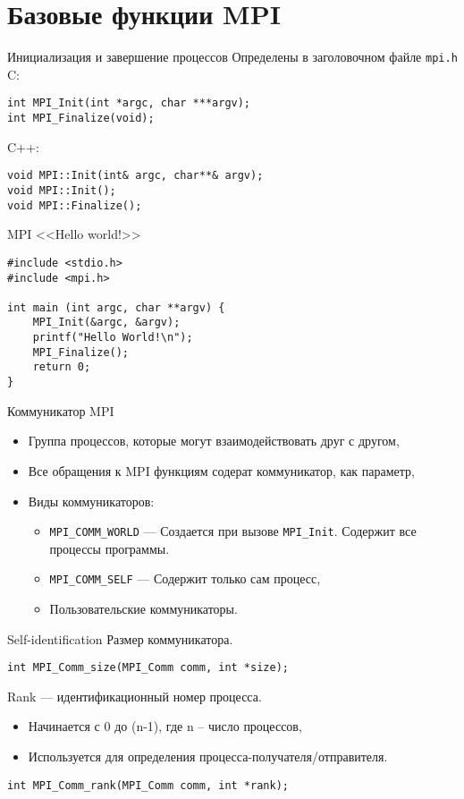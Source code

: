 \section{Базовые функции MPI}

\begin{frame}[fragile]{Инициализация и завершение процессов}
Определены в заголовочном файле \texttt{mpi.h}
\vfill
C:
\begin{lstlisting}
int MPI_Init(int *argc, char ***argv);
int MPI_Finalize(void);
\end{lstlisting}
\vfill
C++:
\begin{lstlisting}
void MPI::Init(int& argc, char**& argv);
void MPI::Init();
void MPI::Finalize();
\end{lstlisting}
\end{frame}

\begin{frame}[fragile]{MPI <<Hello world!>>}
\begin{lstlisting}
#include <stdio.h>
#include <mpi.h>

int main (int argc, char **argv) {
    MPI_Init(&argc, &argv);
    printf("Hello World!\n");
    MPI_Finalize();
    return 0;
}
\end{lstlisting}
\end{frame}

\begin{frame}{Коммуникатор MPI}
\begin{itemize}
    \item Группа процессов, которые могут взаимодействовать друг с другом,
    \item Все обращения к MPI функциям содерат коммуникатор, как параметр,
    \vfill
    \item Виды коммуникаторов:
    \begin{itemize}
        \item \texttt{MPI_COMM_WORLD} --- Создается при вызове \texttt{MPI_Init}.
        Содержит все процессы программы.
        \item \texttt{MPI_COMM_SELF} --- Содержит только сам процесс,
        \item Пользовательские коммуникаторы.
    \end{itemize}
\end{itemize}
\end{frame}

\begin{frame}[fragile]{Self-identification}
Размер коммуникатора.
\begin{lstlisting}
int MPI_Comm_size(MPI_Comm comm, int *size);
\end{lstlisting}
\vfill
Rank --- идентификационный номер процесса.
\begin{itemize}
    \item Начинается с 0 до (n-1), где n -- число процессов,
    \item Используется для определения процесса-получателя/отправителя.
\end{itemize}
\begin{lstlisting}
int MPI_Comm_rank(MPI_Comm comm, int *rank);
\end{lstlisting}
\end{frame}

